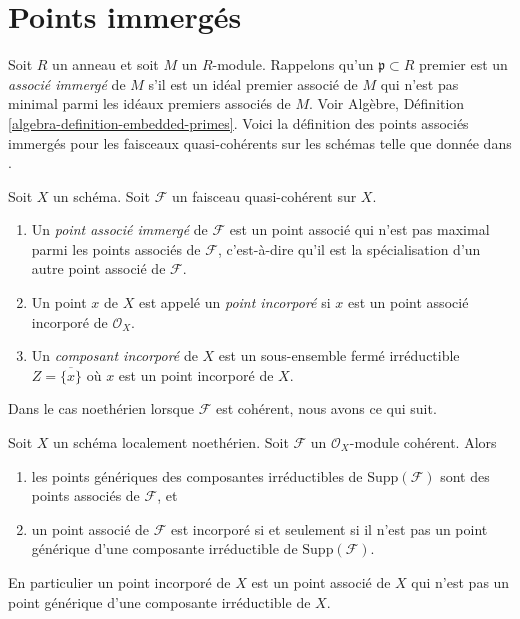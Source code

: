 \section{Points immergés}
\label{section-embedded}

\noindent
Soit  $R$  un anneau et soit  $M$  un  $R$-module. Rappelons
qu'un  $\mathfrak p \subset R$  premier est un  {\it  associé
immergé}  de  $M$  s'il est un idéal premier associé de
 $M$  qui n'est pas minimal parmi les idéaux premiers associés de
 $M$. Voir Algèbre, Définition  \ref{algebra-definition-embedded-primes}. Voici la définition des
points associés immergés pour les faisceaux quasi-cohérents sur les schémas telle
que donnée dans  \cite[IV Definition 3.1.1]{EGA}.

\begin{definition}
\label{definition-embedded}
Soit  $X$  un schéma. Soit  $\mathcal{F}$  un faisceau quasi-cohérent sur
 $X$.
\begin{enumerate}
\item Un  {\it  point associé immergé}  de  $\mathcal{F}$  est
un point associé qui n'est pas maximal parmi les points associés de  $\mathcal{F}$,
c'est-à-dire qu'il est la spécialisation d'un autre point associé de  $\mathcal{F}$.
\item Un point  $x$  de  $X$  est appelé un  {\it  point
incorporé}  si  $x$  est un point associé incorporé de
 $\mathcal{O}_X$.
\item Un  {\it  composant incorporé}  de  $X$  est un
sous-ensemble fermé irréductible  $Z = \overline{\{x\}}$  où  $x$  est un point
incorporé de  $X$.
\end{enumerate}
\end{definition}

\noindent
Dans le cas noethérien lorsque  $\mathcal{F}$  est cohérent, nous avons ce qui suit.

\begin{lemma}
\label{lemma-embedded}
Soit  $X$  un schéma localement noethérien. Soit  $\mathcal{F}$  un
 $\mathcal{O}_X$-module cohérent. Alors
\begin{enumerate}
\item les points génériques des composantes irréductibles de  $\text{Supp}(\mathcal{F})$  sont des
points associés de  $\mathcal{F}$, et
\item un point associé de  $\mathcal{F}$  est incorporé si et seulement si il n'est pas un
point générique d'une composante irréductible de  $\text{Supp}(\mathcal{F})$.
\end{enumerate}
En particulier un point incorporé de $X$  est un point associé de
 $X$ qui n’est pas un point générique d’une composante irréductible
de $X$.
\end{lemma}


